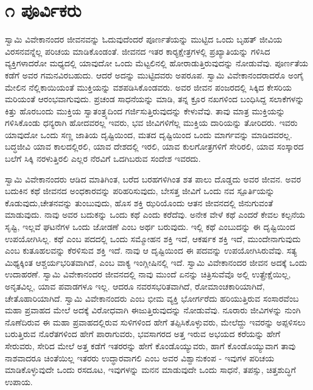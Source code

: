 
\chapter*{೧ ಪೂರ್ವಿಕರು}

ಸ್ವಾಮಿ ವಿವೇಕಾನಂದರ ಜೀವನವನ್ನು ಓದುವುದೆಂದರೆ ಪೂರ್ಣತೆಯನ್ನು ಮುಟ್ಟಿದ ಒಂದು ಬೃಹತ್ ಜೀವಿಯ ವಿರಸನವನ್ನೆಲ್ಲ ಪರಿಚಯ ಮಾಡಿಕೊಂಡಂತೆ. ಜೀವನದ ಇತರ ಕಾರ‍್ಯಕ್ಷೇತ್ರಗಳಲ್ಲಿ ಪ್ರಖ್ಯಾತಿಯನ್ನು ಗಳಿಸಿದ ವ್ಯಕ್ತಿಗಳಾದರೋ ಮಧ್ಯದಲ್ಲಿ ಯಾವುದೋ ಒಂದು ಮೆಟ್ಟಲಿನಲ್ಲಿ ಹೋರಾಡುತ್ತಿರುವುದನ್ನು ನೋಡುವೆವು. ಪೂರ್ಣತೆಯ ಕಡೆಗೆ ಅವರ ಗಮನವಿರಬಹುದು. ಆದರೆ ಅದನ್ನು ಮುಟ್ಟಿದವರು ಅಪರೂಪ. ಸ್ವಾಮಿ ವಿವೇಕಾನಂದರಾದರೊ ಅಂಗೈ ಮೇಲಿನ ನೆಲ್ಲಿಕಾಯಿಯಂತೆ ಮುಕ್ತಿಯನ್ನು ವಶಪಡಿಸಿಕೊಂಡವರು. ಅವರ ಜೀವನ ಪಂಜರದಲ್ಲಿ ಸಿಕ್ಕಿದ ಕೇಸರಿಯ ಮರಿಯಂತೆ ಆರಂಭವಾಗುವುದು. ಪ್ರಚಂಡ ಸಾಧನೆಯನ್ನು ಮಾಡಿ, ತನ್ನ ಕ್ರೂರ ನಖಗಳಿಂದ ಬಂಧಿಸಿದ್ದ ಸಲಾಕೆಗಳನ್ನು ಕಿತ್ತು ಹೊರಬಂದು ಮುಕ್ತಿಯ ಸ್ವಾತಂತ್ರ್ಯದಿಂದ ಗರ್ಜಿಸುತ್ತಿರುವುದನ್ನು ಕೇಳುವೆವು. ತಾವು ಮಾತ್ರ ಮುಕ್ತಿಯನ್ನು ಗಳಿಸಿಕೊಂಡು ಧನ್ಯರಾಗಿ ಹೋದವರಲ್ಲ ಇವರು, ಭವ ಜೀವಿಗಳಿಗೆಲ್ಲ ಮುಕ್ತಿಯ ದಾರಿಯನ್ನು ತೋರಿದರು. ಇವರು ಯಾವುದೋ ಒಂದು ಸಣ್ಣ ಜಾತಿಯ ದೃಷ್ಟಿಯಿಂದ, ಮತದ ದೃಷ್ಟಿಯಿಂದ ಒಂದು ಮಾರ್ಗವನ್ನು ಮಾಡಿದವರಲ್ಲ. ಬದ್ಧಜೀವಿ ಯಾವ ಕಾಲದಲ್ಲಿರಲಿ, ಯಾವ ದೇಶದಲ್ಲಿ ಇರಲಿ, ಯಾವ ಕುಲಗೋತ್ರಗಳಿಗೆ ಸೇರಿರಲಿ, ಯಾವ ಸಂಸ್ಕಾರದ ಬಲೆಗೆ ಸಿಕ್ಕಿ ನರಳುತ್ತಿರಲಿ ಎಲ್ಲರ ನೆರವಿಗೆ ಒದಗಿಬರುವ ಸಂದೇಶ ಇವರದು.

ಸ್ವಾಮಿ ವಿವೇಕಾನಂದರು ಆಡಿದ ಮಾತಿಗಿಂತ, ಬರೆದ ಬರಹಗಳಿಗಿಂತ ಶತ ಪಾಲು ದೊಡ್ಡದು ಅವರ ಜೀವನ. ಅವರ ಬದುಕಿನ ಕಥೆ ಜೀವನದ ಅಂಧಕಾರವನ್ನು ಪರಿಹರಿಸುವುದು, ಬೇಸತ್ತ ಜೀವಿಗೆ ಒಂದು ನವ ಸ್ಪೂರ್ತಿಯನ್ನು ಕೊಡುವುದು,ಚೇತನವನ್ನು ತುಂಬುವುದು, ಹೊಸ ಶಕ್ತಿ ಝರಿಯೊಂದು ಆತನ ಜೀವನದಲ್ಲಿ ಜಿನುಗುವಂತೆ ಮಾಡುವುದು. ನಾವು ಅವರ ಬದುಕನ್ನು ಒಂದು ಕಥೆ ಎಂದು ಕರೆದೆವು. ಅನೇಕ ವೇಳೆ ಕಥೆ ಎಂದರೆ ಕೇವಲ ಕಲ್ಪನೆಯ ಸೃಷ್ಟಿ, ಇಲ್ಲವೆ ಘಟನೆಗಳ ಒಂದು ಜೋಡಣೆ ಎಂಬ ಅರ್ಥ ಬರುವುದು. ಇಲ್ಲಿ ಕಥೆ ಎಂಬುದನ್ನು ಈ ದೃಷ್ಟಿಯಿಂದ ಉಪಯೋಗಿಸಿಲ್ಲ. ಕಥೆ ಎಂಬ ಪದದಲ್ಲಿ ಒಂದು ಸಮ್ಮೋಹನ ಶಕ್ತಿ ಇದೆ, ಆಕರ್ಷಕ ಶಕ್ತಿ ಇದೆ, ಮುಂದೇನಾಗುವುದು ಎಂಬ ಕುತೂಹಲವನ್ನು ಕೆರಳಿಸುವ ಶಕ್ತಿ ಇದೆ. ನಾವು ಆ ದೃಷ್ಟಿಯಿಂದ ಈ ಪದವನ್ನು ಉಪಯೋಗಿಸಿರುವೆವು. ಸತ್ಯ ಮಿಥ್ಯಕ್ಕಿಂತ ಆಶ್ಚರ್ಯಭರಿತವಾಗಿದೆ, ಎಂಬ ವಾಕ್ಯ ಇಂಗ್ಲೀಷಿನಲ್ಲಿ ಇದೆ. ಸ್ವಾಮಿ ವಿವೇಕಾನಂದರ ಜೀವನ ಅದಕ್ಕೆ ಒಂದು ಉದಾಹರಣೆ. ಸ್ವಾಮಿ ವಿವೇಕಾನಂದರ ಜೀವನದಲ್ಲಿ ನಾವು ಮುಂದೆ ಏನನ್ನು ಚಿತ್ರಿಸುವೆವೊ ಅಲ್ಲಿ ಉತ್ಪ್ರೇಕ್ಷೆಯಿಲ್ಲ, ಅನೃತವಿಲ್ಲ, ಯಾವ ಪವಾಡಗಳೂ ಇಲ್ಲ. ಆದರೂ ನವರಸಭರಿತವಾಗಿದೆ, ರೋಮಾಂಚಕಾರಿಯಾಗಿದೆ, ಚೇತೊಹಾರಿಯಾಗಿದೆ. ಸ್ವಾಮಿ ವಿವೇಕಾನಂದರು ಎಂಬ ಭೀಮ ವ್ಯಕ್ತಿ ಭೋರ್ಗರೆದು ಹರಿಯುತ್ತಿರುವ ಸಂಸಾರವೆಂಬ ಮಹಾ ಪ್ರವಾಹದ ಮೇಲೆ ಅದಕ್ಕೆ ವಿರೋಧವಾಗಿ ಈಜುತ್ತಿರುವುದನ್ನು ನೋಡುವೆವು. ನೂರಾರು ಜೀವಿಗಳನ್ನು ನುಂಗಿ ನೊಣೆದಿರುವ ಈ ಮಹಾ ಪ್ರವಾಹದಲ್ಲಿರುವ ಸುಳಿಗಳಿಂದ ಹೇಗೆ ತಪ್ಪಿಸಿಕೊಳ್ಳುವರು, ಮೇಲೆದ್ದು ಇವರನ್ನು ಅಪ್ಪಳಿಸಲು ಬರುತ್ತಿರುವ ನೊರೆತಗಳಿಂದ ಹೇಗೆ ಪಾರಾಗುವರು, ಭವಸಾಗರದ ಅತ್ತ ಇರುವ ಅಭಯದ ಕರೆಯನ್ನು ಹೇಗೆ ಸೇರುವರು, ಸೇರಿದ ಮೇಲೆ ಅತ್ತ ಕಡೆಗೆ ಇತರರನ್ನು ಹೇಗೆ ಕೊಂಡೊಯ್ಯುವರು, ಹಾಗೆ ಕೊಂಡೊಯ್ಯುವಾಗ ತಾವು ನಾಶವಾದರೂ ಚಿಂತೆಯಿಲ್ಲ ಇತರರು ಉದ್ಧಾರವಾಗಲಿ ಎಂಬ ಅವರ ವಿಶ್ವಾನುಕಂಪ - ಇವುಗಳ ಪರಿಚಯ ಮಾಡಿಕೊಳ್ಳುವುದೇ ಒಂದು ರಸದೂಟ, ಇವುಗಳನ್ನು ಮನನ ಮಾಡುವುದೇ ಒಂದು ಸಾಧನೆ, ತಪಸ್ಸು, ಚಿತ್ತಶುದ್ಧಿಗೆ ಉಪಾಯ. 

